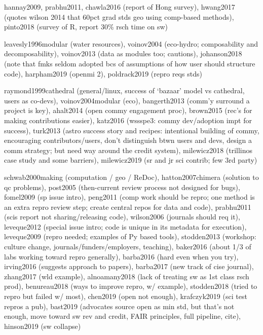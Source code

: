 \documentclass[12pt]{amsart}
\begin{document}
hannay2009, prabhu2011, chawla2016 (report of Hong survey), hwang2017 (quotes wilson 2014 that 60pct grad stds geo using comp-based methods), pinto2018 (survey of R, report 30\% rsch time on sw)

leavesly1996modular (water resources), voinov2004 (eco-hydro; composability and decomposability), voinov2013 (data as modules too; cautions), johanson2018 (note that fmks seldom adopted bcs of assumptions of how user should structure code), harpham2019 (openmi 2), poldrack2019 (repro reqs stds)

raymond1999cathedral (general/linux, success of `bazaar' model vs cathedral, users as co-devs), voinov2004modular (eco), bangerth2013 (comm'y surround a project is key), ahalt2014 (open commy engagement proc), brown2015 (rec's for making contributions easier), katz2016 (wssspe3: commy dev/adoption impt for success), turk2013 (astro success story and recipes: intentional building of commy, encouraging contributors/users, don't distinguish btwn users and devs, design a comm strategy; but need way around the credit system), milewicz2018 (trillinos case study and some barriers), milewicz2019 (sr and jr sci contrib; few 3rd party)

schwab2000making (computation / geo / ReDoc), hatton2007chimera (solution to qc problems), post2005 (then-current review process not designed for bugs), fomel2009 (sp issue intro), peng2011 (comp work should be repro; one method is an extra repro review step; create central repos for data and code), prabhu2011 (scis report not sharing/releasing code), wilson2006 (journals should req it), leveque2012 (special issue intro; code is unique in its metadata for execution), leveque2009 (repro needed; examples of Py based tools), stodden2013 (workshop: culture change, journals/funders/employers, teaching), baker2016 (about 1/3 of labs working toward repro generally), barba2016 (hard even when you try), irving2016 (suggests approach to papers), barba2017 (new track of cise journal), zhang2017 (wld example), alnoamany2018 (lack of treating sw as 1st class rsch prod), benureau2018 (ways to improve repro, w/ example), stodden2018 (tried to repro but failed w/ most), chen2019 (open not enough), krafczyk2019 (sci test repros a pub), bast2019 (advocates source open as min std, but that's not enough, move toward sw rev and credit, FAIR principles, full pipeline, cite), hinson2019 (sw collapse)
\end{document}
